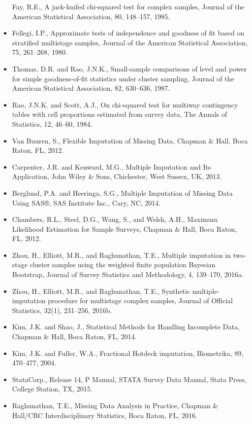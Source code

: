 \documentclass[
  12pt,
]{book}
\begin{document}
\begin{itemize}
  Fay, R.E., A jack-knifed chi-squared test for complex samples, Journal of the American Statistical Association, 80, 148--157, 1985.
\item
  Fellegi, I.P., Approximate tests of independence and goodness of fit based on stratified multistage samples, Journal of the American Statistical Association, 75, 261--268, 1980.
\item
  Thomas, D.R. and Rao, J.N.K., Small-sample comparisons of level and power for simple goodness-of-fit statistics under cluster sampling, Journal of the American Statistical Association, 82, 630--636, 1987.
\item
  Rao, J.N.K. and Scott, A.J., On chi-squared test for multiway contingency tables with cell proportions estimated from survey data, The Annals of Statistics, 12, 46--60, 1984.
\item
  Van Buuren, S., Flexible Imputation of Missing Data, Chapman \& Hall, Boca Raton, FL, 2012.
\item
  Carpenter, J.R. and Kenward, M.G., Multiple Imputation and Its Application, John Wiley \& Sons, Chichester, West Sussex, UK, 2013.
\item
  Berglund, P.A. and Heeringa, S.G., Multiple Imputation of Missing Data Using SAS®, SAS Institute Inc., Cary, NC, 2014.
\item
  Chambers, R.L., Steel, D.G., Wang, S., and Welsh, A.H., Maximum Likelihood Estimation for Sample Surveys, Chapman \& Hall, Boca Raton, FL, 2012.
\item
  Zhou, H., Elliott, M.R., and Raghunathan, T.E., Multiple imputation in two-stage cluster samples using the weighted finite population Bayesian Bootstrap, Journal of Survey Statistics and Methodology, 4, 139--170, 2016a.
\item
  Zhou, H., Elliott, M.R., and Raghunathan, T.E., Synthetic multiple-imputation procedure for multistage complex samples, Journal of Official Statistics, 32(1), 231--256, 2016b.
\item
  Kim, J.K. and Shao, J., Statistical Methods for Handling Incomplete Data, Chapman \& Hall, Boca Raton, FL, 2014.
\item
  Kim, J.K. and Fuller, W.A., Fractional Hotdeck imputation, Biometrika, 89, 470--477, 2004.
\item
  StataCorp., Release 14, P Manual, STATA Survey Data Manual, Stata Press, College Station, TX, 2015.
\item
  Raghunathan, T.E., Missing Data Analysis in Practice, Chapman \& Hall/CRC Interdisciplinary Statistics, Boca Raton, FL, 2016.

\end{itemize}
\end{document}
